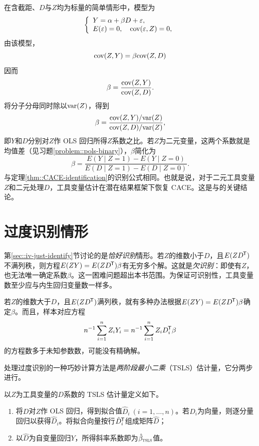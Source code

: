 \begin{example}\label{eg::scalar-iv}
在含截距、$D$与$Z$均为标量的简单情形中，模型为
$$
\left\{ \begin{array}{l}
Y = \alpha +  \beta  D + \varepsilon ,\\
E(\varepsilon) = 0, \quad \textup{cov}(\varepsilon, Z) = 0,
\end{array}
\right.
$$
由该模型，
$$
\textup{cov}( Z, Y ) = \beta \textup{cov}(Z, D) 
$$
因而
$$
 \beta = \frac{ \textup{cov}( Z, Y )   }{ \textup{cov}(Z, D) }.
$$
将分子分母同时除以$\textup{var}(Z)$，得到
$$
\beta =  \frac{ \textup{cov}( Z, Y ) / \textup{var}(Z)  }{ \textup{cov}(Z, D) / \textup{var}(Z) },
$$
即$Y$和$D$分别对$Z$作 OLS 回归所得$Z$系数之比。若$Z$为二元变量，这两个系数就是均值差（见习题\ref{problem::pols-binary}），$\beta$简化为
$$
\beta = \frac{ E(Y\mid Z=1) - E(Y\mid Z=0)  }{ E(D\mid Z=1) - E(D\mid Z=0) } .
$$
与定理\ref{thm::CACE-identification}的识别公式相同。也就是说，对于二元工具变量$Z$和二元处理$D$，工具变量估计在潜在结果框架下恢复 CACE。这是\citet{imbens1994identification}与\citet{angrist1996identification}的关键结论。  
\end{example}



 

\section{过度识别情形}
\label{sec::sec::iv-over-identify}

第\ref{sec::iv-just-identify}节讨论的是{\it 恰好识别}情形。若$Z$的维数小于$D$，且$E(ZD^{\mkern-1.5mu\mathsf{T}})$不满列秩，则方程$E(  ZY)  = E(ZD^{\mkern-1.5mu\mathsf{T}}) \beta$有无穷多个解。这就是{\it 欠识别}：即使有$Z$，也无法唯一确定系数$\beta$。这一困难问题超出本书范围。为保证可识别性，工具变量数至少应与内生回归变量数一样多。 

若$Z$的维数大于$D$，且$E(ZD^{\mkern-1.5mu\mathsf{T}})$满列秩，就有多种办法根据$E(  ZY)  = E(ZD^{\mkern-1.5mu\mathsf{T}}) \beta$确定$\beta$。而且，样本对应方程
$$
n^{-1} \sum_{i=1}^n Z_iY_i = n^{-1} \sum_{i=1}^n Z_i D_i^{\mkern-1.5mu\mathsf{T}} \beta
$$
的方程数多于未知参数数，可能没有精确解。 


处理过度识别的一种巧妙计算方法是{\it 两阶段最小二乘}（TSLS）估计量\citep{theil1953estimation, basmann1957generalized}，它分两步进行。

\begin{definition}
[两阶段最小二乘法]\label{def::2sls}
以$Z$为工具变量的$D$系数的 TSLS 估计量定义如下。 
\begin{enumerate}
\item
将$D$对$Z$作 OLS 回归，得到拟合值$\hat{D}_i\ (i=1,\ldots, n)$。若$D_i$为向量，则逐分量回归以获得$\hat{D}_i$。将拟合向量按行$\hat{D}_i^{\mkern-1.5mu\mathsf{T}} $组成矩阵$\hat{D}$；
\item
以$\hat{D}$为自变量回归$Y$，所得斜率系数即为$\hat{\beta}_\textsc{tsls}$值。  
\end{enumerate}
\end{definition}
 

